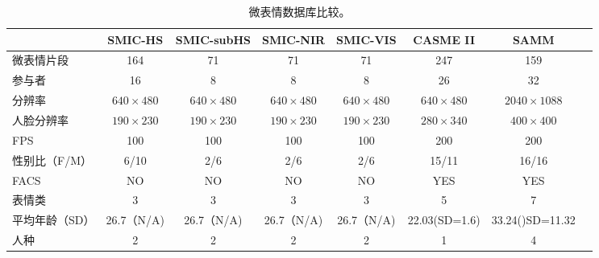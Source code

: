 \begin{table}[!htbp]
\caption{微表情数据库比较。}
   \label{tab1}
   \centering
   \footnotesize%
   \setlength{\tabcolsep}{4pt}%
   \renewcommand{\arraystretch}{1.2}%
   \begin{tabular}{lccccccc}
   \hline
        & SMIC-HS &  SMIC-subHS &  SMIC-NIR &  SMIC-VIS &  CASME II &  SAMM \\ \hline
微表情片段    & 164       & 71         & 71       & 71       & 247           & 159             \\
参与者      & 16        & 8          & 8        & 8        & 26            & 32              \\
分辨率      & $640\times480$   & $640\times480$    & $640\times480$  & $640\times480$  & $640\times480$       & $2040\times1088$      \\
人脸分辨率    & $190\times230$   & $190\times230$    & $190\times230$  & $190\times230$  & $280\times340$       & $400\times400$         \\
FPS      & 100       & 100        & 100      & 100      & 200           & 200             \\
性别比（F/M） & 6/10      &  2/6          &  2/6        &  2/6        & 15/11         & 16/16           \\
FACS     & NO        & NO         & NO       & NO       & YES           & YES             \\
表情类      & 3         & 3          & 3        & 3        & 5             & 7               \\
平均年龄（SD） & 26.7（N/A) &   26.7（N/A) &  26.7（N/A) & 26.7（N/A)  & 22.03(SD=1.6) & 33.24()SD=11.32 \\
人种       & 2         & 2           &  2        & 2         & 1             & 4               \\
\hline
   \end{tabular}
\end{table}

